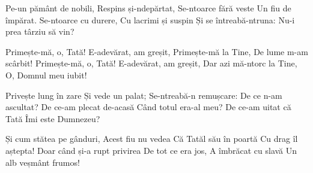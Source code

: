 \beginverse
Pe-un pământ de nobili,
Respins și-ndepărtat,
Se-ntoarce fără veste
Un fiu de împărat.
Se-ntoarce cu durere,
Cu lacrimi și suspin
Și se întreabă-ntruna:
Nu-i prea târziu să vin?
\endverse

\beginchorus
Primește-mă, o, Tată!
E-adevărat, am greșit,
Primește-mă la Tine,
De lume m-am scârbit!
Primește-mă, o, Tată!
E-adevărat, am greșit,
Dar azi mă-ntorc la Tine,
O, Domnul meu iubit!
\endchorus

\beginverse
Privește lung în zare
Și vede un palat;
Se-ntreabă-n remușcare:
De ce n-am ascultat?
De ce-am plecat de-acasă
Când totul era-al meu?
De ce-am uitat că Tată
Îmi este Dumnezeu?
\endverse

\beginverse
Și cum stătea pe gânduri,
Acest fiu nu vedea
Că Tatăl său în poartă
Cu drag îl aștepta!
Doar când și-a rupt privirea
De tot ce era jos,
A îmbrăcat cu slavă
Un alb veșmânt frumos!
\endverse
\endsong